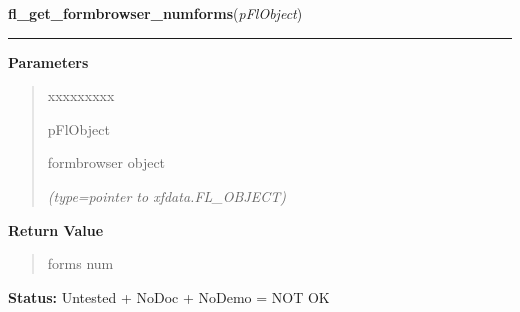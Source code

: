     \label{xformslib:flformbrowser:fl_get_formbrowser_numforms}

    \vspace{0.5ex}

\hspace{.8\funcindent}\begin{boxedminipage}{\funcwidth}

    \raggedright \textbf{fl\_get\_formbrowser\_numforms}(\textit{pFlObject})

    \vspace{-1.5ex}

    \rule{\textwidth}{0.5\fboxrule}
\setlength{\parskip}{2ex}
\setlength{\parskip}{1ex}
      \textbf{Parameters}
      \vspace{-1ex}

      \begin{quote}
        \begin{Ventry}{xxxxxxxxx}

          \item[pFlObject]

          formbrowser object

            {\it (type=pointer to xfdata.FL\_OBJECT)}

        \end{Ventry}

      \end{quote}

      \textbf{Return Value}
    \vspace{-1ex}

      \begin{quote}
      forms num

      \end{quote}

\textbf{Status:} Untested + NoDoc + NoDemo = NOT OK



    \end{boxedminipage}

    \label{xformslib:flformbrowser:fl_get_formbrowser_form}

    \vspace{0.5ex}

